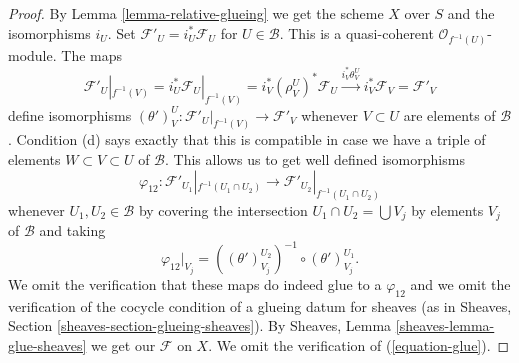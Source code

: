 \begin{proof}
By Lemma \ref{lemma-relative-glueing} we get the scheme $X$ over $S$
and the isomorphisms $i_U$.
Set $\mathcal{F}'_U = i_U^*\mathcal{F}_U$ for $U \in \mathcal{B}$.
This is a quasi-coherent $\mathcal{O}_{f^{-1}(U)}$-module.
The maps
$$
\mathcal{F}'_U|_{f^{-1}(V)} =
i_U^*\mathcal{F}_U|_{f^{-1}(V)} =
i_V^*(\rho^U_V)^*\mathcal{F}_U \xrightarrow{i_V^*\theta^U_V}
i_V^*\mathcal{F}_V = \mathcal{F}'_V
$$
define isomorphisms
$(\theta')^U_V : \mathcal{F}'_U|_{f^{-1}(V)} \to \mathcal{F}'_V$
whenever $V \subset U$ are elements of $\mathcal{B}$.
Condition (d) says exactly that this is compatible in case
we have a triple of elements $W \subset V \subset U$ of $\mathcal{B}$.
This allows us to get well defined isomorphisms
$$
\varphi_{12} :
\mathcal{F}'_{U_1}|_{f^{-1}(U_1 \cap U_2)}
\longrightarrow
\mathcal{F}'_{U_2}|_{f^{-1}(U_1 \cap U_2)}
$$
whenever $U_1, U_2 \in \mathcal{B}$ by covering the intersection
$U_1 \cap U_2 = \bigcup V_j$ by elements $V_j$ of $\mathcal{B}$
and taking
$$
\varphi_{12}|_{V_j} =
\left((\theta')^{U_2}_{V_j}\right)^{-1}
\circ
(\theta')^{U_1}_{V_j}.
$$
We omit the verification that these maps do indeed glue to a
$\varphi_{12}$ and we omit the verification of the
cocycle condition of a glueing datum for sheaves
(as in Sheaves, Section \ref{sheaves-section-glueing-sheaves}).
By Sheaves, Lemma \ref{sheaves-lemma-glue-sheaves}
we get our $\mathcal{F}$ on $X$. We omit the verification
of (\ref{equation-glue}).
\end{proof}

